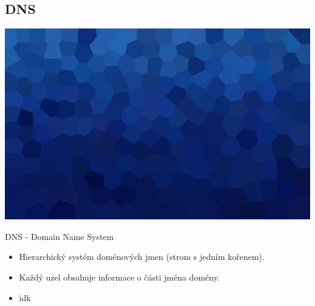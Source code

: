 \documentclass[aspectratio=169,xcolor=dvipsnames, t]{beamer}
\begin{document}
\subsection{DNS}
{
    \includegraphics[width=\paperwidth,height=\paperheight]{AICStyleData/logos/mene_polygonu_bg.png}
}
\begin{frame}{DNS - Domain Name System}
    \begin{itemize}
        \item Hierarchický systém doménových jmen (strom s jedním kořenem).
        \item Každý uzel obsahuje informace o části jména domény.
        \item idk
    \end{itemize}
\end{frame}
\makefinalpage
\end{document}
